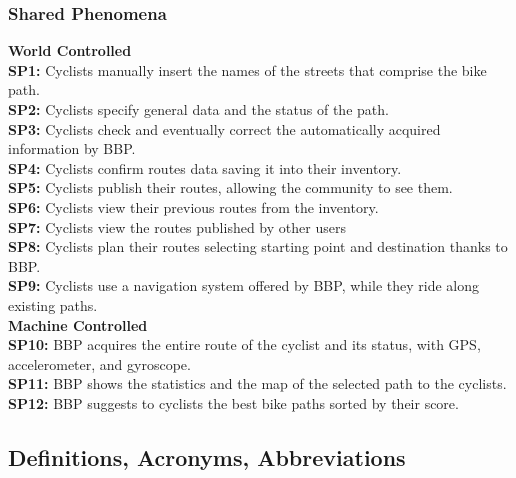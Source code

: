 \subsubsection{Shared Phenomena}
\textbf{World Controlled} \\
\textbf{SP1:} Cyclists manually insert the names of the streets that comprise the bike path. \\
\textbf{SP2:} Cyclists specify general data and the status of the path. \\
\textbf{SP3:} Cyclists check and eventually correct the automatically acquired information by BBP. \\
\textbf{SP4:} Cyclists confirm routes data saving it into their inventory. \\   
\textbf{SP5:} Cyclists publish their routes, allowing the community to see them. \\
\textbf{SP6:} Cyclists view their previous routes from the inventory. \\
\textbf{SP7:} Cyclists view the routes published by other users \\
\textbf{SP8:} Cyclists plan their routes selecting starting point and destination thanks to BBP. \\
\textbf{SP9:} Cyclists use a navigation system offered by BBP, while they ride along existing paths. \\[8pt]
\textbf{Machine Controlled} \\
\textbf{SP10:} BBP acquires the entire route of the cyclist and its status, with GPS, accelerometer, and gyroscope. \\
\textbf{SP11:} BBP shows the statistics and the map of the selected path to the cyclists. \\
\textbf{SP12:} BBP suggests to cyclists the best bike paths sorted by their score. 
\subsection{Definitions, Acronyms, Abbreviations}
